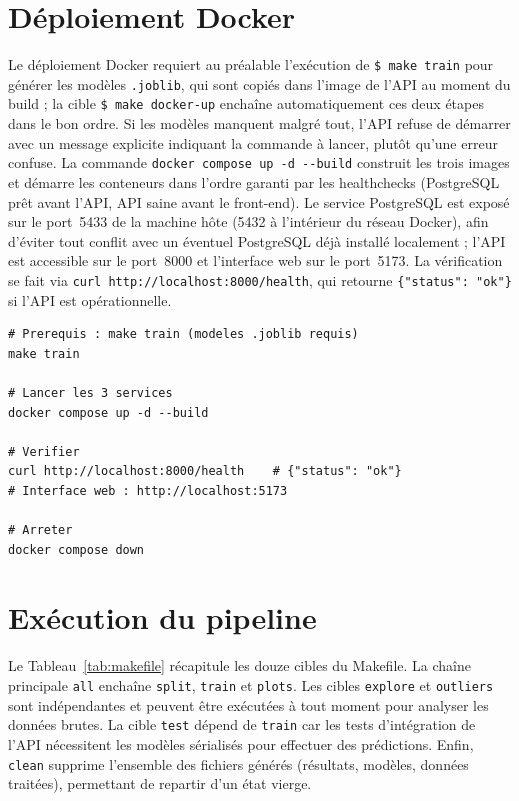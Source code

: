 \documentclass[12pt,a4paper,openany]{report}
\newcommand{\cmd}[1]{\texttt{\$ #1}}
\begin{document}
\section{Déploiement Docker}

Le déploiement Docker requiert au préalable l'exécution de \cmd{make train} pour générer les modèles \texttt{.joblib}, qui sont copiés dans l'image de l'API au moment du build ; la cible \cmd{make docker-up} enchaîne automatiquement ces deux étapes dans le bon ordre. Si les modèles manquent malgré tout, l'API refuse de démarrer avec un message explicite indiquant la commande à lancer, plutôt qu'une erreur confuse. La commande \texttt{docker compose up -d -{}-build} construit les trois images et démarre les conteneurs dans l'ordre garanti par les healthchecks (PostgreSQL prêt avant l'API, API saine avant le front-end). Le service PostgreSQL est exposé sur le port~5433 de la machine hôte (5432 à l'intérieur du réseau Docker), afin d'éviter tout conflit avec un éventuel PostgreSQL déjà installé localement ; l'API est accessible sur le port~8000 et l'interface web sur le port~5173. La vérification se fait via \texttt{curl http://localhost:8000/health}, qui retourne \texttt{\{"status": "ok"\}} si l'API est opérationnelle.

\begin{lstlisting}[style=bash, caption={Déploiement avec Docker Compose}]
# Prerequis : make train (modeles .joblib requis)
make train

# Lancer les 3 services
docker compose up -d --build

# Verifier
curl http://localhost:8000/health    # {"status": "ok"}
# Interface web : http://localhost:5173

# Arreter
docker compose down
\end{lstlisting}

\section{Exécution du pipeline}

Le Tableau~\ref{tab:makefile} récapitule les douze cibles du Makefile. La chaîne principale \texttt{all} enchaîne \texttt{split}, \texttt{train} et \texttt{plots}. Les cibles \texttt{explore} et \texttt{outliers} sont indépendantes et peuvent être exécutées à tout moment pour analyser les données brutes. La cible \texttt{test} dépend de \texttt{train} car les tests d'intégration de l'API nécessitent les modèles sérialisés pour effectuer des prédictions. Enfin, \texttt{clean} supprime l'ensemble des fichiers générés (résultats, modèles, données traitées), permettant de repartir d'un état vierge.
\end{document}
